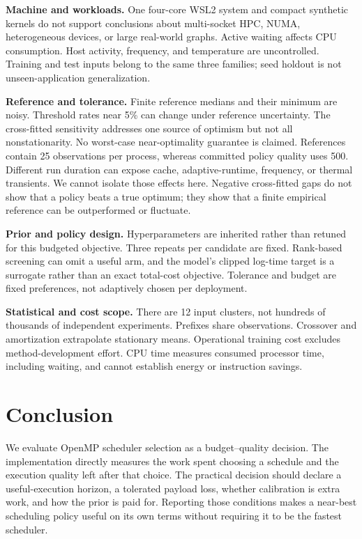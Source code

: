 \documentclass[conference]{IEEEtran}
\begin{document}
\textbf{Machine and workloads.} One four-core WSL2 system and compact
synthetic kernels do not support conclusions about multi-socket HPC, NUMA,
heterogeneous devices, or large real-world graphs. Active waiting affects
CPU consumption. Host activity, frequency, and temperature are uncontrolled.
Training and test inputs belong to the same three families; seed holdout is
not unseen-application generalization.

\textbf{Reference and tolerance.} Finite reference medians and their minimum
are noisy. Threshold rates near 5\% can change under reference uncertainty.
The cross-fitted sensitivity addresses one source of optimism but not all
nonstationarity. No worst-case near-optimality guarantee is claimed.
References contain 25 observations per process, whereas committed policy
quality uses 500. Different run duration can expose cache, adaptive-runtime,
frequency, or thermal transients. We cannot isolate those effects here.
Negative cross-fitted gaps do not show that a policy beats a true optimum;
they show that a finite empirical reference can be outperformed or fluctuate.

\textbf{Prior and policy design.} Hyperparameters are inherited rather than
retuned for this budgeted objective. Three repeats per candidate are fixed.
Rank-based screening can omit a useful arm, and the model's clipped log-time
target is a surrogate rather than an exact total-cost objective. Tolerance
and budget are fixed preferences, not adaptively chosen per deployment.

\textbf{Statistical and cost scope.} There are 12 input clusters, not hundreds
of thousands of independent experiments. Prefixes share observations.
Crossover and amortization extrapolate stationary means. Operational training
cost excludes method-development effort. CPU time measures consumed processor
time, including waiting, and cannot establish energy or instruction savings.

\section{Conclusion}

We evaluate OpenMP scheduler selection as a budget--quality decision.
The implementation directly measures the work spent choosing a schedule and
the execution quality left after that choice. \ConclusionResults{}
The practical decision should declare a useful-execution horizon, a tolerated
payload loss, whether calibration is extra work, and how the prior is paid
for. Reporting those conditions makes a near-best scheduling policy useful
on its own terms without requiring it to be the fastest scheduler.
\end{document}
